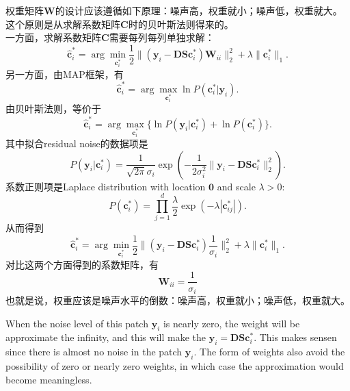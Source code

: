 \documentclass[10pt,twocolumn,letterpaper]{article}
\begin{document}
权重矩阵$\mathbf{W}$的设计应该遵循如下原理：噪声高，权重就小；噪声低，权重就大。这个原则是从求解系数矩阵$\mathbf{C}$时的贝叶斯法则得来的。
\\
一方面，求解系数矩阵$\mathbf{C}$需要每列每列单独求解：
\begin{equation}
\hat{\mathbf{c}}_{i}^{*}
=
\arg\min_{\mathbf{c}_{i}^{*}}\frac{1}{2}\|(\mathbf{y}_{i}-\mathbf{D}\mathbf{S}\mathbf{c}_{i}^{*})\mathbf{W}_{ii}\|_{2}^{2}
+
\lambda\|\mathbf{c}_{i}^{*}\|_{1}.
\end{equation}
另一方面，由MAP框架，有
\begin{equation}
\hat{\mathbf{c}}_{i}^{*} = \arg\max_{\mathbf{c}_{i}^{*}}\ln P(\mathbf{c}_{i}^{*}|\mathbf{y}_{i}).
\end{equation}
由贝叶斯法则，等价于
\begin{equation}
\hat{\mathbf{c}}_{i}^{*} = \arg\max_{\mathbf{c}_{i}^{*}}\{\ln P(\mathbf{y}_{i}|\mathbf{c}_{i}^{*})+\ln P(\mathbf{c}_{i}^{*})\}.
\end{equation}
其中拟合residual noise的数据项是
\begin{equation}
P(\mathbf{y}_{i}|\mathbf{c}_{i}^{*}) = \frac{1}{\sqrt{2\pi}\sigma_{i}}\exp(-\frac{1}{2\sigma_{i}^{2}}\|\mathbf{y}_{i}-\mathbf{D}\mathbf{S}\mathbf{c}_{i}^{*}\|_{2}^{2}).
\end{equation}
系数正则项是Laplace distribution with location $\mathbf{0}$ and scale $\lambda>0$:
\begin{equation}
P(\mathbf{c}_{i}^{*})=\prod_{j=1}^{d}\frac{\lambda}{2}\exp(-\lambda|\mathbf{c}_{ij}^{*}|).
\end{equation}
从而得到
\begin{equation}
\hat{\mathbf{c}}_{i}^{*}=\arg\min_{\mathbf{c}_{i}^{*}}\frac{1}{2}\|(\mathbf{y}_{i}-\mathbf{D}\mathbf{S}\mathbf{c}_{i}^{*})\frac{1}{\sigma_{i}}\|_{2}^{2}+\lambda\|\mathbf{c}_{i}^{*}\|_{1}.
\end{equation}
对比这两个方面得到的系数矩阵，有
\begin{equation}
\mathbf{W}_{ii} = \frac{1}{\sigma_{i}}
\end{equation}
也就是说，权重应该是噪声水平的倒数：噪声高，权重就小；噪声低，权重就大。

When the noise level of this patch $\mathbf{y}_{i}$ is nearly zero, the weight will be approximate the infinity, and this will make the $\mathbf{y}_{i}=\mathbf{D}\mathbf{S}\mathbf{c}_{i}^{*}$. This makes sensen since there is almost no noise in the patch $\mathbf{y}_{i}$. The form of weights also avoid the possibility of zero or nearly zero weights, in which case the approximation would become meaningless.
\end{document}
